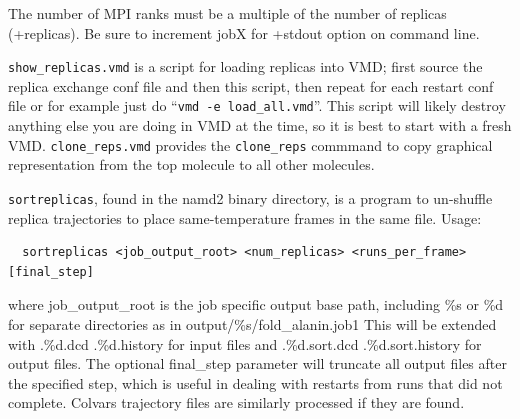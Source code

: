 The number of MPI ranks must be a multiple of the number of replicas
(+replicas).  Be sure to increment jobX for +stdout option on command line.

{\tt show\_replicas.vmd} is a script for loading replicas into VMD;
first source the replica exchange conf file and then this script, then
repeat for each restart conf file or for example just do
``{\tt vmd -e load\_all.vmd}''.
This script will likely destroy anything else you are doing in VMD at the
time, so it is best to start with a fresh VMD.
{\tt clone\_reps.vmd} provides the {\tt clone\_reps} commmand to copy graphical
representation from the top molecule to all other molecules.

{\tt sortreplicas}, found in the namd2 binary directory, is a program to un-shuffle
replica trajectories to place same-temperature frames in the same file.
Usage:
\begin{verbatim}
  sortreplicas <job_output_root> <num_replicas> <runs_per_frame> [final_step]
\end{verbatim}
where job\_output\_root is the job specific output base path, including
\%s or \%d for separate directories as in output/\%s/fold\_alanin.job1
This will be extended with .\%d.dcd .\%d.history for input files and
.\%d.sort.dcd .\%d.sort.history for output files.  The optional final\_step
parameter will truncate all output files after the specified step,
which is useful in dealing with restarts from runs that did not complete.
Colvars trajectory files are similarly processed if they are found.

